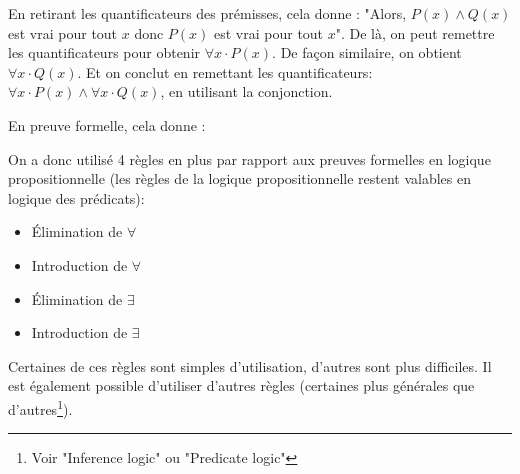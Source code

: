 En retirant les quantificateurs des prémisses, cela donne :
"Alors, $P(x) \wedge Q(x)$ est vrai pour tout $x$ donc $P(x)$ est vrai pour tout $x$". 
De là, on peut remettre les quantificateurs pour obtenir $\forall x \cdot P(x)$. De façon similaire, on obtient $\forall x \cdot Q(x)$. Et on conclut en remettant les quantificateurs: $\forall x \cdot P(x) \wedge \forall x \cdot Q(x)$, en utilisant la conjonction.

En preuve formelle, cela donne :

\begin{center}
\end{center}

On a donc utilisé 4 règles en plus par rapport aux preuves formelles en logique propositionnelle (les règles de la logique propositionnelle restent valables en logique des prédicats):
\begin{itemize}
\item Élimination de $\forall$
\item Introduction de $\forall$
\item Élimination de $\exists$
\item Introduction de $\exists$
\end{itemize}

Certaines de ces règles sont simples d'utilisation, d'autres sont plus difficiles. Il est également possible d'utiliser d'autres règles (certaines plus générales que d'autres\footnote{Voir "Inference logic" ou "Predicate logic"}).

